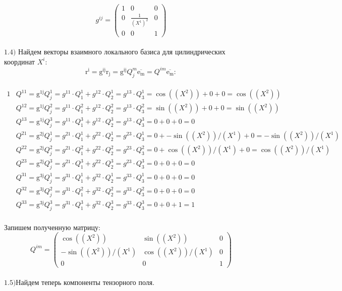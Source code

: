\documentclass[a4paper, 12pt, oneside]{article}
\begin{document}
\[
g^{ij}=\begin{pmatrix}
	1 & 0 & 0\\
	0 & \frac{1}{(X^1)^2} & 0\\
	0 & 0 & 1
\end{pmatrix}
\]\\
$\mathrm{1.4)}$ Найдем векторы взаимного локального базиса для цилиндрических координат $X^i$:\\
\[
\mathrm{r^{i}} = \mathrm{g^{{ij}}}\mathrm{r_j} = \mathrm{g^{{ij}}}Q^m_j\overline{\mathrm{e_m}} = Q^{im}\overline{\mathrm{e_m}}:
\]\\
\begin{alignat*}{1}
  & Q^{11} = \mathrm{g^{1j}}Q^1_j = g^{11} \cdot Q^1_1+ g^{12} \cdot Q^1_2= g^{13} \cdot Q^1_3= \cos((X^2))+ 0+ 0= \cos((X^2)) \\
  & Q^{12} = \mathrm{g^{1j}}Q^2_j = g^{11} \cdot Q^2_1+ g^{12} \cdot Q^2_2= g^{13} \cdot Q^2_3= \sin((X^2))+ 0+ 0= \sin((X^2)) \\
  & Q^{13} = \mathrm{g^{1j}}Q^3_j = g^{11} \cdot Q^3_1+ g^{12} \cdot Q^3_2= g^{13} \cdot Q^3_3= 0+ 0+ 0= 0 \\
  & Q^{21} = \mathrm{g^{2j}}Q^1_j = g^{21} \cdot Q^1_1+ g^{22} \cdot Q^1_2= g^{23} \cdot Q^1_3= 0+ -\sin((X^2))/(X^1)+ 0= -\sin((X^2))/(X^1) \\
  & Q^{22} = \mathrm{g^{2j}}Q^2_j = g^{21} \cdot Q^2_1+ g^{22} \cdot Q^2_2= g^{23} \cdot Q^2_3= 0+ \cos((X^2))/(X^1)+ 0= \cos((X^2))/(X^1) \\
  & Q^{23} = \mathrm{g^{2j}}Q^3_j = g^{21} \cdot Q^3_1+ g^{22} \cdot Q^3_2= g^{23} \cdot Q^3_3= 0+ 0+ 0= 0 \\
  & Q^{31} = \mathrm{g^{3j}}Q^1_j = g^{31} \cdot Q^1_1+ g^{32} \cdot Q^1_2= g^{33} \cdot Q^1_3= 0+ 0+ 0= 0 \\
  & Q^{32} = \mathrm{g^{3j}}Q^2_j = g^{31} \cdot Q^2_1+ g^{32} \cdot Q^2_2= g^{33} \cdot Q^2_3= 0+ 0+ 0= 0 \\
  & Q^{33} = \mathrm{g^{3j}}Q^3_j = g^{31} \cdot Q^3_1+ g^{32} \cdot Q^3_2= g^{33} \cdot Q^3_3= 0+ 0+ 1= 1 
\end{alignat*}\\
Запишем полученную матрицу:\\
\[
Q^{im}=\begin{pmatrix}
	\cos((X^2)) & \sin((X^2)) & 0\\
	-\sin((X^2))/(X^1) & \cos((X^2))/(X^1) & 0\\
	0 & 0 & 1
\end{pmatrix}
\]\\
$\mathrm{1.5)}$Найдем теперь компоненты тензорного поля.\\
\end{document}
